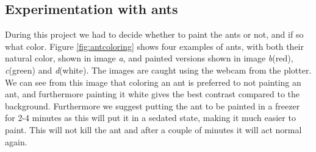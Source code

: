 
\subsection{Experimentation with ants}
\label{ants}

During this project we had to decide whether to paint the ants or not, and if so what color. Figure \ref{fig:antcoloring} shows four examples of ants, with both their natural color, shown in image \emph{a}, and painted versions shown in image \emph{b}(red), \emph{c}(green) and \emph{d}(white). The images are caught using the webcam from the plotter. We can see from this image that coloring an ant is preferred to not painting an ant, and furthermore painting it white gives the best contrast compared to the background. Furthermore we suggest putting the ant to be painted in a freezer for 2-4 minutes as this will put it in a sedated state, making it much easier to paint. This will not kill the ant and after a couple of minutes it will act normal again.\\

